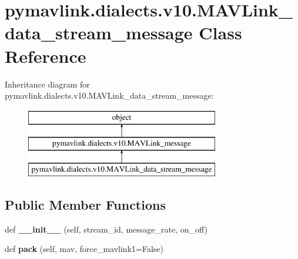 \hypertarget{classpymavlink_1_1dialects_1_1v10_1_1MAVLink__data__stream__message}{}\section{pymavlink.\+dialects.\+v10.\+M\+A\+V\+Link\+\_\+data\+\_\+stream\+\_\+message Class Reference}
\label{classpymavlink_1_1dialects_1_1v10_1_1MAVLink__data__stream__message}
Inheritance diagram for pymavlink.\+dialects.\+v10.\+M\+A\+V\+Link\+\_\+data\+\_\+stream\+\_\+message\+:\begin{figure}[H]
\begin{center}
\leavevmode
\includegraphics[height=3.000000cm]{classpymavlink_1_1dialects_1_1v10_1_1MAVLink__data__stream__message}
\end{center}
\end{figure}
\subsection*{Public Member Functions}
\begin{DoxyCompactItemize}
\item 
\mbox{\label{classpymavlink_1_1dialects_1_1v10_1_1MAVLink__data__stream__message_a32bd57f70bccec2dea3be73d61320eef}} 
def {\bfseries \+\_\+\+\_\+init\+\_\+\+\_\+} (self, stream\+\_\+id, message\+\_\+rate, on\+\_\+off)
\item 
\mbox{\label{classpymavlink_1_1dialects_1_1v10_1_1MAVLink__data__stream__message_a06fb1d93f1702f59cc6c097ac0ab6d2a}} 
def {\bfseries pack} (self, mav, force\+\_\+mavlink1=False)
\end{DoxyCompactItemize}
